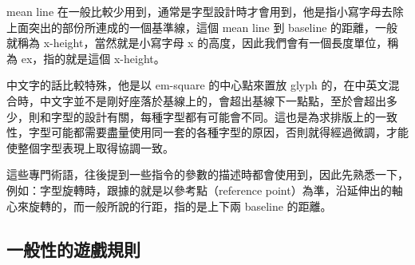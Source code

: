 mean line 在一般比較少用到，通常是字型設計時才會用到，他是指小寫字母去除上面突出的部份所連成的一個基準線，這個 mean line 到 baseline 的距離，一般就稱為 x-height，當然就是小寫字母 x 的高度，因此我們會有一個長度單位，稱為 ex，指的就是這個 x-height。

中文字的話比較特殊，他是以 em-square 的中心點來置放 glyph 的，在中英文混合時，中文字並不是剛好座落於基線上的，會超出基線下一點點，至於會超出多少，則和字型的設計有關，每種字型都有可能會不同。這也是為求排版上的一致性，字型可能都需要盡量使用同一套的各種字型的原因，否則就得經過微調，才能使整個字型表現上取得協調一致。

這些專門術語，往後提到一些指令的參數的描述時都會使用到，因此先熟悉一下，例如：字型旋轉時，跟據的就是以參考點（reference point）為準，沿延伸出的軸心來旋轉的，而一般所說的行距，指的是上下兩 baseline 的距離。

\subsection{一般性的遊戲規則}
\label{gen:gamerules}

